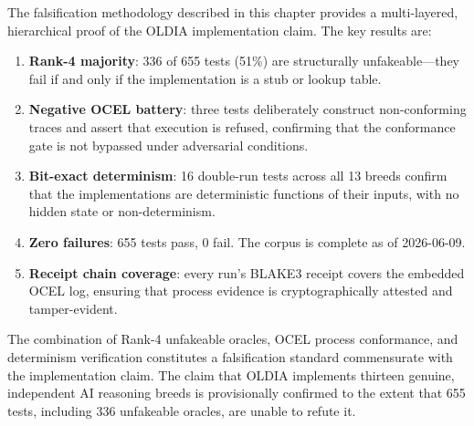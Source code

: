 The falsification methodology described in this chapter provides a multi-layered, hierarchical
proof of the OLDIA implementation claim. The key results are:

\begin{enumerate}
  \item \textbf{Rank-4 majority}: 336 of 655 tests (51\%) are structurally unfakeable---they
    fail if and only if the implementation is a stub or lookup table.
  \item \textbf{Negative OCEL battery}: three tests deliberately construct non-conforming
    traces and assert that execution is refused, confirming that the conformance gate is not
    bypassed under adversarial conditions.
  \item \textbf{Bit-exact determinism}: 16 double-run tests across all 13 breeds confirm that
    the implementations are deterministic functions of their inputs, with no hidden state or
    non-determinism.
  \item \textbf{Zero failures}: 655 tests pass, 0 fail. The corpus is complete as of
    2026-06-09.
  \item \textbf{Receipt chain coverage}: every run's BLAKE3 receipt covers the embedded OCEL
    log, ensuring that process evidence is cryptographically attested and tamper-evident.
\end{enumerate}

The combination of Rank-4 unfakeable oracles, OCEL process conformance, and determinism
verification constitutes a falsification standard commensurate with the implementation claim.
The claim that OLDIA implements thirteen genuine, independent AI reasoning breeds is
provisionally confirmed to the extent that 655 tests, including 336 unfakeable oracles, are
unable to refute it.
